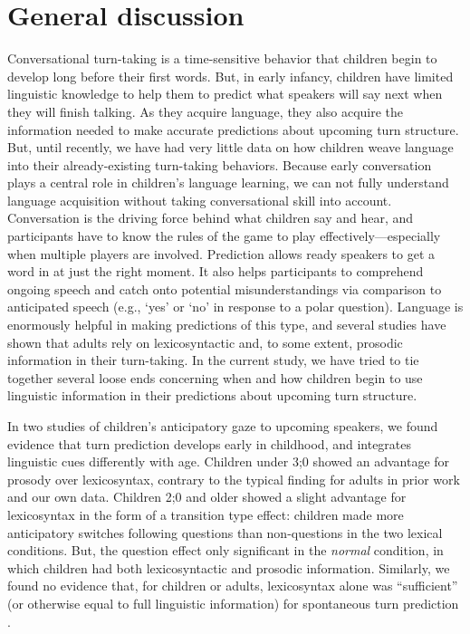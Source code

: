 \documentclass[authoryear, 12pt]{elsarticle}
\begin{document}


\section{General discussion}
\label{sec:gendisc}

Conversational turn-taking is a time-sensitive behavior that children begin to develop long before their first words. But, in early infancy, children have limited linguistic knowledge to help them to predict what speakers will say next when they will finish talking. As they acquire language, they also acquire the information needed to make accurate predictions about upcoming turn structure. But, until recently, we have had very little data on how children weave language into their already-existing turn-taking behaviors. Because early conversation plays a central role in children's language learning, we can not fully understand language acquisition without taking conversational skill into account. Conversation is the driving force behind what children say and hear, and participants have to know the rules of the game to play effectively---especially when multiple players are involved. Prediction allows ready speakers to get a word in at just the right moment. It also helps participants to comprehend  ongoing speech and catch onto potential misunderstandings via comparison to anticipated speech (e.g., `yes' or `no' in response to a polar question). Language is enormously helpful in making predictions of this type, and several studies have shown that adults rely on lexicosyntactic \citep{de-ruiter2006, magyari2012} and, to some extent, prosodic information \citep{ford1996, bogelsUndRev} in their turn-taking. In the current study, we have tried to tie together several loose ends concerning when and how children begin to use linguistic information in their predictions about upcoming turn structure.

In two studies of children's anticipatory gaze to upcoming speakers, we found evidence that turn prediction develops early in childhood, and integrates linguistic cues differently with age. Children under 3;0 showed an advantage for prosody over lexicosyntax, contrary to the typical finding for adults in prior work \citep{de-ruiter2006} and our own data. Children 2;0 and older showed a slight advantage for lexicosyntax in the form of a transition type effect: children made more anticipatory switches following questions than non-questions in the two lexical conditions. But, the question effect only significant in the \textit{normal} condition, in which children had both lexicosyntactic and prosodic information. Similarly, we found no evidence that, for children or adults, lexicosyntax alone was ``sufficient'' (or otherwise equal to full linguistic information) for spontaneous turn prediction \citep[pg. 531]{de-ruiter2006}. 
\end{document}
